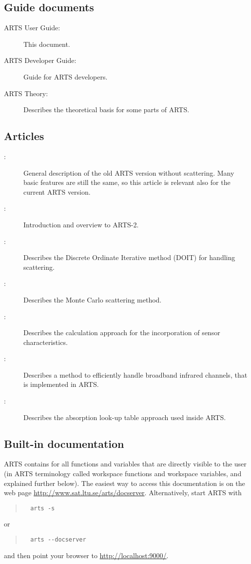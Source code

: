 \subsection{Guide documents}

\begin{description}
\item[ARTS User Guide:] This document.
\item[ARTS Developer Guide:] Guide for ARTS developers.
\item[ARTS Theory:] Describes the theoretical basis for some parts of ARTS.
\end{description}

\subsection{Articles}

\begin{description}
\item[\citet{buehler:artst:05}:] General description of the old ARTS
  version without scattering. Many basic features are still the same,
  so this article is relevant also for the current ARTS version.
\item[\citet{eriksson:arts2:11}:] Introduction and overview to ARTS-2.
\item[\citet{emde04:_doit_jgr}:] Describes the Discrete Ordinate Iterative
  method (DOIT) for handling scattering.
\item[\citet{davisetal:04}:] Describes the Monte Carlo scattering method.
\item[\citet{eriksson:06}:] Describes the calculation approach for the
  incorporation of sensor characteristics.
\item[\citet{buehler:effic:10}:] Describes a method to efficiently handle
  broadband infrared channels, that is implemented in ARTS.
\item[\citet{buehler:absor:11}:] Describes the absorption look-up table
  approach used inside ARTS.
\end{description}

\subsection{Built-in documentation}
\label{sec:built-in_doc}

ARTS contains  for all functions and
variables that are directly visible to the user (in ARTS terminology
called workspace functions and workspace variables, and explained
further below).  The easiest way to access this documentation is on
the web page
\url{http://www.sat.ltu.se/arts/docserver}. Alternatively, start ARTS
with
\begin{quote}
\begin{verbatim}
  arts -s
\end{verbatim}
\end{quote}
or
\begin{quote}
\begin{verbatim}
  arts --docserver
\end{verbatim}
\end{quote}
and then point your browser to \url{http://localhost:9000/}.

